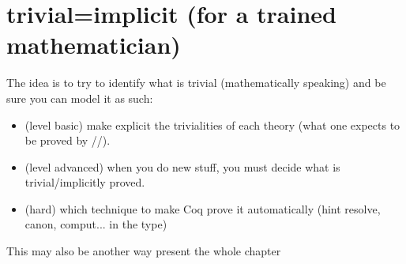 \section{trivial=implicit (for a trained mathematician)}
The idea is to try to identify what is trivial (mathematically speaking)
and be sure you can model it as such:
\begin{itemize}
\item (level basic) make explicit the trivialities of each theory (what one
	expects to be proved by //). 
\item (level advanced) when you do new stuff, you must decide what is
	trivial/implicitly proved.
\item (hard) which technique to make Coq prove it automatically (hint resolve,
	canon, comput... in the type)
\end{itemize}

This may also be another way present the whole chapter



